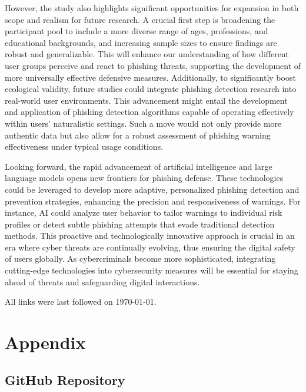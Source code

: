 \documentclass[
  a4paper,  %
  twoside,  %
  bibliography=totoc,
  headsepline,
  cleardoublepage=empty,
  parskip=half,
  draft=false
]{scrbook}
\begin{document}
However, the study also highlights significant opportunities for expansion in both scope and realism for future research. A crucial first step is broadening the participant pool to include a more diverse range of ages, professions, and educational backgrounds, and increasing sample sizes to ensure findings are robust and generalizable. This will enhance our understanding of how different user groups perceive and react to phishing threats, supporting the development of more universally effective defensive measures. Additionally, to significantly boost ecological validity, future studies could integrate phishing detection research into real-world user environments. This advancement might entail the development and application of phishing detection algorithms capable of operating effectively within users' naturalistic settings. Such a move would not only provide more authentic data but also allow for a robust assessment of phishing warning effectiveness under typical usage conditions.

Looking forward, the rapid advancement of artificial intelligence and large language models opens new frontiers for phishing defense. These technologies could be leveraged to develop more adaptive, personalized phishing detection and prevention strategies, enhancing the precision and responsiveness of warnings. For instance, AI could analyze user behavior to tailor warnings to individual risk profiles or detect subtle phishing attempts that evade traditional detection methods. This proactive and technologically innovative approach is crucial in an era where cyber threats are continually evolving, thus ensuring the digital safety of users globally. As cybercriminals become more sophisticated, integrating cutting-edge technologies into cybersecurity measures will be essential for staying ahead of threats and safeguarding digital interactions.

%
%


\printbibliography

All links were last followed on \today{}.

\appendix
\chapter{Appendix}

\section{GitHub Repository}
\label{sec:github}
\end{document}
